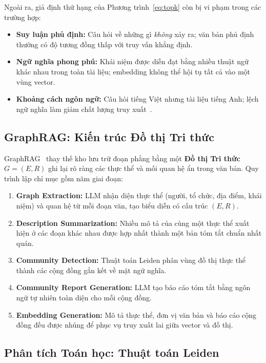 \documentclass[10pt, conference, a4paper]{IEEEtran}
\begin{document}
Ngoài ra, giả định thứ hạng của Phương trình~\eqref{eq:topk} còn bị
vi phạm trong các trường hợp:
\begin{itemize}
  \item \textbf{Suy luận phủ định:} Câu hỏi về những gì \emph{không}
    xảy ra; văn bản phủ định thường có độ tương đồng thấp với truy
    vấn khẳng định.
  \item \textbf{Ngữ nghĩa phong phú:} Khái niệm được diễn đạt bằng
    nhiều thuật ngữ khác nhau trong toàn tài liệu; embedding không
    thể hội tụ tất cả vào một vùng vector.
  \item \textbf{Khoảng cách ngôn ngữ:} Câu hỏi tiếng Việt nhưng tài
    liệu tiếng Anh; lệch ngữ nghĩa làm giảm chất lượng truy
    xuất~\cite{shi2023large}.
\end{itemize}

\subsection{GraphRAG: Kiến trúc Đồ thị Tri thức}

GraphRAG~\cite{edge2024graphrag} thay thế kho lưu trữ đoạn phẳng
bằng một \textbf{Đồ thị Tri thức} $G = (E, R)$ ghi lại rõ ràng các
thực thể và mối quan hệ ẩn trong văn bản. Quy trình lập chỉ mục gồm
năm giai đoạn:
\begin{enumerate}
  \item \textbf{Graph Extraction:} LLM nhận diện thực thể (người, tổ
    chức, địa điểm, khái niệm) và quan hệ từ mỗi đoạn văn, tạo biểu
    diễn có cấu trúc $(E, R)$.
  \item \textbf{Description Summarization:} Nhiều mô tả của cùng một
    thực thể xuất hiện ở các đoạn khác nhau được hợp nhất thành một
    bản tóm tắt chuẩn nhất quán.
  \item \textbf{Community Detection:} Thuật toán Leiden phân vùng đồ
    thị thực thể thành các cộng đồng gắn kết về mặt ngữ nghĩa.
  \item \textbf{Community Report Generation:} LLM tạo báo cáo tóm tắt
    bằng ngôn ngữ tự nhiên toàn diện cho mỗi cộng đồng.
  \item \textbf{Embedding Generation:} Mô tả thực thể, đơn vị văn bản
    và báo cáo cộng đồng đều được nhúng để phục vụ truy xuất lai giữa
    vector và đồ thị.
\end{enumerate}

\subsection{Phân tích Toán học: Thuật toán Leiden}
\end{document}
